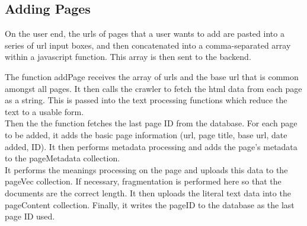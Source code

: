 \subsection{Adding Pages}
On the user end, the urls of pages that a user wants to add are pasted into a series of url input boxes, and then concatenated into a comma-separated array within a javascript function. This array is then sent to the backend.

The function addPage receives the array of urls and the base url that is common amongst all pages. It then calls the crawler to fetch the html data from each page as a string. This is passed into the text processing functions which reduce the text to a usable form. \\
Then the the function fetches the last page ID from the database. For each page to be added, it adds the basic page information (url, page title, base url, date added, ID). It then performs metadata processing and adds the page's metadata to the pageMetadata collection. \\
It performs the meanings processing on the page and uploads this data to the pageVec collection. If necessary, fragmentation is performed here so that the documents are the correct length. It then uploads the literal text data into the pageContent collection. Finally, it writes the pageID to the database as the last page ID used.
